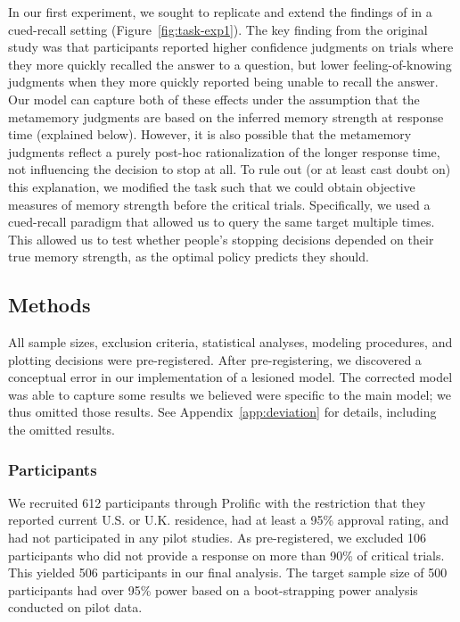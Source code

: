 In our first experiment, we sought to replicate and extend the findings of \citet{costermans1992confidence} in a cued-recall setting (Figure~\ref{fig:task-exp1}). The key finding from the original study was that participants reported higher confidence judgments on trials where they more quickly recalled the answer to a question, but lower feeling-of-knowing judgments when they more quickly reported being unable to recall the answer. Our model can capture both of these effects under the assumption that the metamemory judgments are based on the inferred memory strength at response time (explained below). However, it is also possible that the metamemory judgments reflect a purely post-hoc rationalization of the longer response time, not influencing the decision to stop at all. To rule out (or at least cast doubt on) this explanation, we modified the task such that we could obtain objective measures of memory strength before the critical trials. Specifically, we used a cued-recall paradigm that allowed us to query the same target multiple times. This allowed us to test whether people's stopping decisions depended on their true memory strength, as the optimal policy predicts they should.

\subsection{Methods}

All sample sizes, exclusion criteria, statistical analyses, modeling procedures, and plotting decisions were pre-registered. After pre-registering, we discovered a conceptual error in our implementation of a lesioned model. The corrected model was able to capture some results we believed were specific to the main model; we thus omitted those results. See Appendix~\ref{app:deviation} for details, including the omitted results.

\subsubsection{Participants}

We recruited 612 participants through Prolific with the restriction that they reported current U.S. or U.K. residence, had at least a 95\% approval rating, and had not participated in any pilot studies. As pre-registered, we excluded 106 participants who did not provide a response on more than 90\% of critical trials. This yielded 506 participants in our final analysis. The target sample size of 500 participants had over 95\% power based on a boot-strapping power analysis conducted on pilot data.

